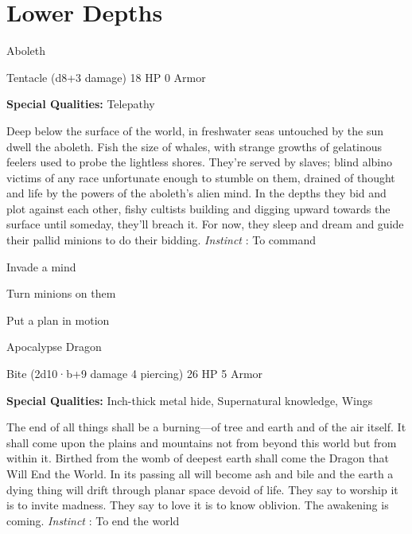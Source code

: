 \chapter{Lower Depths}
  
 


\startMonsterName
Aboleth	 
\stopMonsterName
 

Tentacle (d8+3 damage)	18 HP	0 Armor

 


 
\startMonsterQualities
{\bf Special Qualities:}  Telepathy
\stopMonsterQualities
 
\startMonsterDescription
Deep below the surface of the world, in freshwater seas untouched by the sun dwell the aboleth. Fish the size of whales, with strange growths of gelatinous feelers used to probe the lightless shores. They’re served by slaves; blind albino victims of any race unfortunate enough to stumble on them, drained of thought and life by the powers of the aboleth’s alien mind. In the depths they bid and plot against each other, fishy cultists building and digging upward towards the surface until someday, they’ll breach it. For now, they sleep and dream and guide their pallid minions to do their bidding. {\em Instinct} : To command
\stopMonsterDescription
 
\startitemize[1,packed]

\item Invade a mind

 
\item Turn minions on them

 
\item Put a plan in motion


\stopitemize
 
\startMonsterName
Apocalypse Dragon	 
\stopMonsterName
 

Bite (2d10·b+9 damage 4 piercing)	26 HP	5 Armor

 


 
\startMonsterQualities
{\bf Special Qualities:}  Inch-thick metal hide, Supernatural knowledge, Wings
\stopMonsterQualities
 
\startMonsterDescription
The end of all things shall be a burning—of tree and earth and of the air itself. It shall come upon the plains and mountains not from beyond this world but from within it. Birthed from the womb of deepest earth shall come the Dragon that Will End the World. In its passing all will become ash and bile and the earth a dying thing will drift through planar space devoid of life. They say to worship it is to invite madness. They say to love it is to know oblivion. The awakening is coming. {\em Instinct} : To end the world
\stopMonsterDescription
 
